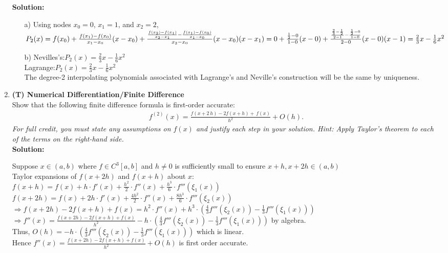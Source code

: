 \documentclass[12pt]{article}
\begin{document}
\begin{enumerate}[label=\bfseries Problem \arabic*:]
\vspace{1em}
\textbf{Solution:}\par
\begin{itemize}
    \item [a)] Using nodes $x_0=0$, $x_1=1$, and $x_2=2$, $P_2(x)=f(x_0)+\frac{f(x_1)-f(x_0)}{x_1-x_0}(x-x_0)+\frac{\frac{f(x_2)-f(x_1)}{x_2-x_1}-\frac{f(x_1)-f(x_0)}{x_1-x_0}}{x_2-x_0}(x-x_0)(x-x_1)\\
    =0+\frac{\frac{1}{2}-0}{1-0}(x-0)+\frac{\frac{\frac{2}{3}-\frac{1}{2}}{2-1}-\frac{\frac{1}{2}-0}{1-0}}{2-0}(x-0)(x-1)\\
    =\frac{2}{3}x-\frac{1}{6}x^2$
    \item [b)] Nevilles's:$P_2(x)=\frac{2}{3}x-\frac{1}{6}x^2$\\
    Lagrange:$P_2(x)=\frac{2}{3}x-\frac{1}{6}x^2$\\
    The degree-2 interpolating polynomials associated with Lagrange's and Neville's construction will be the same by uniqueness.
\end{itemize}
\newpage



 \item \textbf{(T) Numerical Differentiation/Finite Difference}\\
Show that the following finite difference formula is first-order accurate:
\begin{align*}
f^{(2)}(x)= \frac{ f(x+2\, h)-2 f(x+h)+\,f(x)}{h^2}+{O}(h).
\end{align*}
\textit{For full credit, you must state any assumptions on $f(x)$ and justify each step in your solution. Hint: Apply Taylor's theorem to each of the terms on the right-hand side. }\\

\textbf{Solution:}\par
Suppose $x\in(a,b)$ where $f\in C^3[a,b]$ and $h\neq 0$ is sufficiently small to ensure $x+h,x+2h\in(a,b)$\\
Taylor expansions of $f(x+2h)$ and $f(x+h)$ about $x$:\\
$f(x+h)=f(x)+h\cdot f'(x)+\frac{h^2}{2}\cdot f''(x)+\frac{h^3}{6}\cdot f'''(\xi_1(x))$\\
$f(x+2h)=f(x)+2h\cdot f'(x)+\frac{4h^2}{2}\cdot f''(x)+\frac{8h^3}{6}\cdot f'''(\xi_2(x))$\\
$\Rightarrow f(x+2h)-2f(x+h)+f(x)=h^2\cdot f''(x)+h^3\cdot (\frac{4}{3}f'''(\xi_2(x))-\frac{1}{3}f'''(\xi_1(x)))$\\
$\Rightarrow f''(x)=\frac{f(x+2h)-2f(x+h)+f(x)}{h^2}-h\cdot (\frac{4}{3}f'''(\xi_2(x))-\frac{1}{3}f'''(\xi_1(x)))$ by algebra.\\
Thus, $O(h)=-h\cdot (\frac{4}{3}f'''(\xi_2(x))-\frac{1}{3}f'''(\xi_1(x)))$ which is linear.\\
Hence $f''(x)=\frac{f(x+2h)-2f(x+h)+f(x)}{h^2}+O(h)$ is first order accurate.
\end{enumerate}
\end{document}
